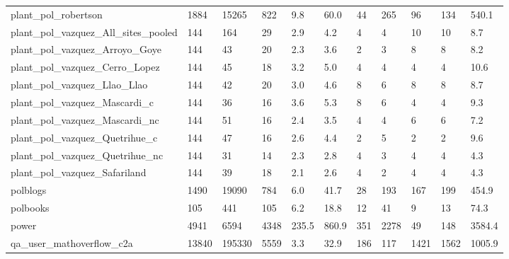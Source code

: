 \begin{longtable}{lllllllllll}
 plant\_pol\_robertson                                & 1884       & 15265     & 822   & 9.8    & 60.0   & 44    & 265    & 96     & 134    & 540.1   \\
 plant\_pol\_vazquez\_All\_sites\_pooled                 & 144        & 164       & 29    & 2.9    & 4.2    & 4     & 4      & 10     & 10     & 8.7     \\
 plant\_pol\_vazquez\_Arroyo\_Goye                      & 144        & 43        & 20    & 2.3    & 3.6    & 2     & 3      & 8      & 8      & 8.2     \\
 plant\_pol\_vazquez\_Cerro\_Lopez                      & 144        & 45        & 18    & 3.2    & 5.0    & 4     & 4      & 4      & 4      & 10.6    \\
 plant\_pol\_vazquez\_Llao\_Llao                        & 144        & 42        & 20    & 3.0    & 4.6    & 8     & 6      & 8      & 8      & 8.7     \\
 plant\_pol\_vazquez\_Mascardi\_c                       & 144        & 36        & 16    & 3.6    & 5.3    & 8     & 6      & 4      & 4      & 9.3     \\
 plant\_pol\_vazquez\_Mascardi\_nc                      & 144        & 51        & 16    & 2.4    & 3.5    & 4     & 4      & 6      & 6      & 7.2     \\
 plant\_pol\_vazquez\_Quetrihue\_c                      & 144        & 47        & 16    & 2.6    & 4.4    & 2     & 5      & 2      & 2      & 9.6     \\
 plant\_pol\_vazquez\_Quetrihue\_nc                     & 144        & 31        & 14    & 2.3    & 2.8    & 4     & 3      & 4      & 4      & 4.3     \\
 plant\_pol\_vazquez\_Safariland                       & 144        & 39        & 18    & 2.1    & 2.6    & 4     & 2      & 4      & 4      & 4.3     \\
 polblogs                                           & 1490       & 19090     & 784   & 6.0    & 41.7   & 28    & 193    & 167    & 199    & 454.9   \\
 polbooks                                           & 105        & 441       & 105   & 6.2    & 18.8   & 12    & 41     & 9      & 13     & 74.3    \\
 power                                              & 4941       & 6594      & 4348  & 235.5  & 860.9  & 351   & 2278   & 49     & 148    & 3584.4  \\
 qa\_user\_mathoverflow\_c2a                           & 13840      & 195330    & 5559  & 3.3    & 32.9   & 186   & 117    & 1421   & 1562   & 1005.9  \\

\end{longtable}
